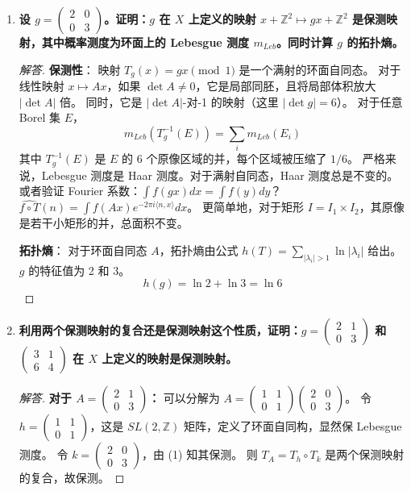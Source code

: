 \documentclass[a4paper,12pt]{article}
\newenvironment{solution}{\begin{proof}[解答]}{\end{proof}}
\begin{document}
\begin{enumerate}
    \item \textbf{设 $g = \begin{pmatrix} 2 & 0 \\ 0 & 3 \end{pmatrix}$。证明：$g$ 在 $X$ 上定义的映射 $x+\mathbb{Z}^2 \mapsto gx+\mathbb{Z}^2$ 是保测映射，其中概率测度为环面上的 Lebesgue 测度 $m_{Leb}$。同时计算 $g$ 的拓扑熵。}
    
    \begin{solution}
        \textbf{保测性}：
        映射 $T_g(x) = gx \pmod 1$ 是一个满射的环面自同态。
        对于线性映射 $x \mapsto Ax$，如果 $\det A \neq 0$，它是局部同胚，且将局部体积放大 $|\det A|$ 倍。
        同时，它是 $|\det A|$-对-1 的映射（这里 $|\det g| = 6$）。
        对于任意 Borel 集 $E$，
        $$ m_{Leb}(T_g^{-1}(E)) = \sum_{i} m_{Leb}(E_i) $$
        其中 $T_g^{-1}(E)$ 是 $E$ 的 6 个原像区域的并，每个区域被压缩了 $1/6$。
        严格来说，Lebesgue 测度是 Haar 测度。对于满射自同态，Haar 测度总是不变的。
        或者验证 Fourier 系数：$\int f(gx) dx = \int f(y) dy$？
        $\widehat{f \circ T}(n) = \int f(Ax) e^{-2\pi i \langle n, x \rangle} dx$。
        更简单地，对于矩形 $I = I_1 \times I_2$，其原像是若干小矩形的并，总面积不变。
        
        \textbf{拓扑熵}：
        对于环面自同态 $A$，拓扑熵由公式 $h(T) = \sum_{|\lambda_i| > 1} \ln |\lambda_i|$ 给出。
        $g$ 的特征值为 2 和 3。
        $$ h(g) = \ln 2 + \ln 3 = \ln 6 $$
    \end{solution}

    \item \textbf{利用两个保测映射的复合还是保测映射这个性质，证明：$g = \begin{pmatrix} 2 & 1 \\ 0 & 3 \end{pmatrix}$ 和 $\begin{pmatrix} 3 & 1 \\ 6 & 4 \end{pmatrix}$ 在 $X$ 上定义的映射是保测映射。}
    
    \begin{solution}
        \textbf{对于 $A = \begin{pmatrix} 2 & 1 \\ 0 & 3 \end{pmatrix}$：}
        可以分解为 $A = \begin{pmatrix} 1 & 1 \\ 0 & 1 \end{pmatrix} \begin{pmatrix} 2 & 0 \\ 0 & 3 \end{pmatrix}$。
        令 $h = \begin{pmatrix} 1 & 1 \\ 0 & 1 \end{pmatrix}$，这是 $SL(2, \mathbb{Z})$ 矩阵，定义了环面自同构，显然保 Lebesgue 测度。
        令 $k = \begin{pmatrix} 2 & 0 \\ 0 & 3 \end{pmatrix}$，由 (1) 知其保测。
        则 $T_A = T_h \circ T_k$ 是两个保测映射的复合，故保测。
        

\end{solution}
\end{enumerate}
\end{document}
